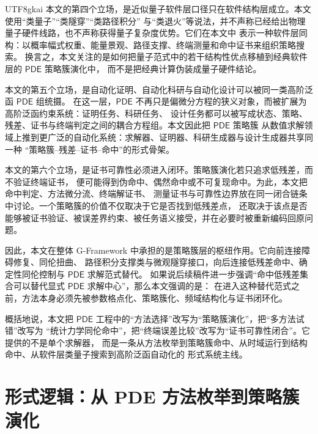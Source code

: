 \documentclass[12pt]{article}
\newcommand{\GFramework}{\textsf{G-Framework}}
\newcommand{\PDE}{\mathsf{PDE}}
\begin{document}
\begin{CJK*}{UTF8}{gkai}
本文的第四个立场，是近似量子软件层口径只在软件结构层成立。本文使用“类量子”“类隧穿”“类路径积分”
与“类退火”等说法，并不声称已经给出物理量子硬件线路，也不声称获得量子复杂度优势。它们在本文中
表示一种软件层同构：以概率幅式权重、能量景观、路径支撑、终端测量和命中证书来组织策略搜索。
换言之，本文关注的是如何把量子范式中的若干结构性优点移植到经典软件层的 \(\PDE\) 策略簇演化中，
而不是把经典计算伪装成量子硬件结论。

本文的第五个立场，是自动化证明、自动化科研与自动化设计可以被同一类高阶泛函 \(\PDE\) 组统摄。
在这一层，\(\PDE\) 不再只是偏微分方程的狭义对象，而被扩展为高阶泛函约束系统：证明任务、科研任务、
设计任务都可以被写成状态、策略、残差、证书与终端判定之间的耦合方程组。本文因此把 \(\PDE\) 策略簇
从数值求解领域上推到更广泛的自动化系统：求解器、证明器、科研生成器与设计生成器共享同一种
“策略簇--残差--证书--命中”的形式骨架。

本文的第六个立场，是证书可靠性必须进入闭环。策略簇演化若只追求低残差，而不验证终端证书，
便可能得到伪命中、偶然命中或不可复现命中。为此，本文把命中判定、方法微分流、终端解证书、
测量证书与可靠性边界放在同一闭合链条中讨论。一个策略簇的价值不仅取决于它是否找到低残差点，
还取决于该点是否能够被证书验证、被误差界约束、被任务语义接受，并在必要时被重新编码回原问题。

因此，本文在整体 \GFramework{} 中承担的是策略簇层的枢纽作用。它向前连接障碍修复、同伦扭曲、
路径积分支撑类与微观隧穿接口，向后连接低残差命中、确定性同伦控制与 \(\PDE\) 求解范式替代。
如果说后续稿件进一步强调“命中低残差集合可以替代显式 \(\PDE\) 求解中心”，那么本文强调的是：
在进入这种替代范式之前，方法本身必须先被参数格点化、策略簇化、频域结构化与证书闭环化。

概括地说，本文把 \(\PDE\) 工程中的“方法选择”改写为“策略簇演化”，把“多方法试错”改写为
“统计力学同伦命中”，把“终端误差比较”改写为“证书可靠性闭合”。它提供的不是单个求解器，
而是一条从方法枚举到策略簇命中、从时域运行到结构命中、从软件层类量子搜索到高阶泛函自动化的
形式系统主线。

\setcounter{tocdepth}{3}
\setcounter{secnumdepth}{3}
\tableofcontents
\clearpage

\section{形式逻辑：从 PDE 方法枚举到策略簇演化}
\label{sec:tex53-main}


\end{CJK*}
\end{document}
